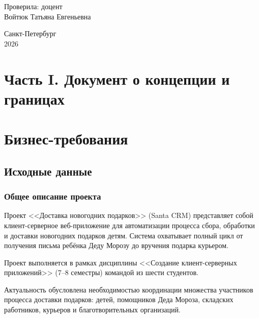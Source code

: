 \documentclass[14pt,a4paper]{extarticle}
\begin{document}
\begin{titlepage}
\begin{flushright}
\vspace{6mm}

Проверила: доцент\\
Войтюк Татьяна Евгеньевна
\end{flushright}

\vfill

\begin{center}
Санкт-Петербург\\
2026
\end{center}

\end{titlepage}

\tableofcontents
\newpage


\section*{Часть I. Документ о концепции и границах}

\section{Бизнес-требования}

\subsection{Исходные данные}

\subsubsection{Общее описание проекта}

Проект <<Доставка новогодних подарков>> (Santa CRM) представляет собой клиент-серверное веб-приложение для автоматизации процесса сбора, обработки и доставки новогодних подарков детям. Система охватывает полный цикл от получения письма ребёнка Деду Морозу до вручения подарка курьером.

Проект выполняется в рамках дисциплины <<Создание клиент-серверных приложений>> (7--8 семестры) командой из шести студентов.

Актуальность обусловлена необходимостью координации множества участников процесса доставки подарков: детей, помощников Деда Мороза, складских работников, курьеров и благотворительных организаций.
\end{document}

